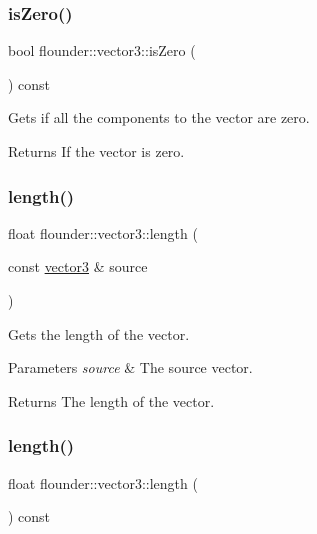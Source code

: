 \subsubsection{\texorpdfstring{is\+Zero()}{isZero()}}
{\footnotesize\ttfamily bool flounder\+::vector3\+::is\+Zero (\begin{DoxyParamCaption}{ }\end{DoxyParamCaption}) const}



Gets if all the components to the vector are zero. 

\begin{DoxyReturn}{Returns}
If the vector is zero. 
\end{DoxyReturn}
\mbox{\label{classflounder_1_1vector3_a2264de66d0b62a4a996586a9638650da}} 
\subsubsection{\texorpdfstring{length()}{length()}\hspace{0.1cm}{\footnotesize\ttfamily [1/2]}}
{\footnotesize\ttfamily float flounder\+::vector3\+::length (\begin{DoxyParamCaption}\item[{const \hyperlink{classflounder_1_1vector3}{vector3} \&}]{source }\end{DoxyParamCaption})\hspace{0.3cm}{\ttfamily [static]}}



Gets the length of the vector. 


\begin{DoxyParams}{Parameters}
{\em source} & The source vector. \\
\hline
\end{DoxyParams}
\begin{DoxyReturn}{Returns}
The length of the vector. 
\end{DoxyReturn}
\mbox{\label{classflounder_1_1vector3_a1ed0ea13c16392ef7f3b56ea96777144}} 
\subsubsection{\texorpdfstring{length()}{length()}\hspace{0.1cm}{\footnotesize\ttfamily [2/2]}}
{\footnotesize\ttfamily float flounder\+::vector3\+::length (\begin{DoxyParamCaption}{ }\end{DoxyParamCaption}) const}



